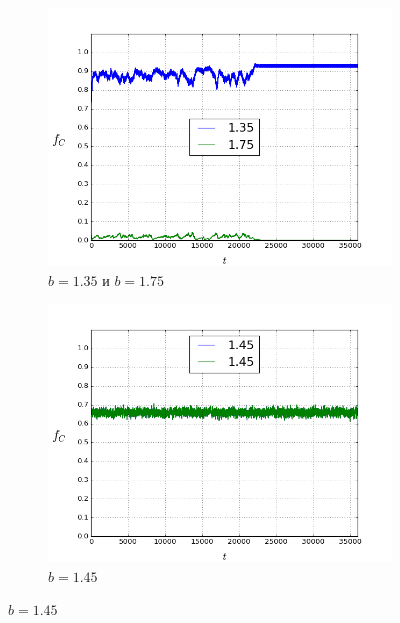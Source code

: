 \documentclass[a4paper]{article}
\begin{document}
\begin{figure}[H]
	\begin{subfigure}{.5\textwidth}
		\includegraphics[width=.8\linewidth]{135-175.png}
		\caption{$b=1.35$ и $b=1.75$}
	\end{subfigure}
	\begin{subfigure}{.5\textwidth}
		\includegraphics[width=.8\linewidth]{145-145.png}
		\caption{$b=1.45$}
	\end{subfigure}%
	

\end{figure}
\end{document}
